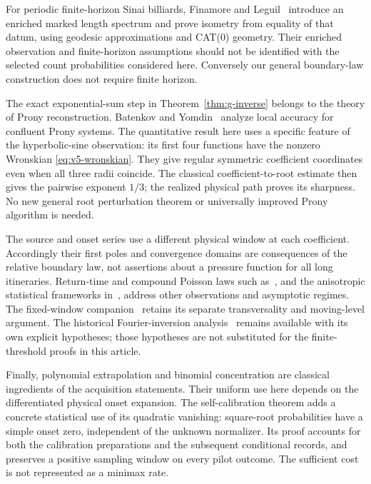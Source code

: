 For periodic finite-horizon Sinai billiards, Finamore and
Leguil~\cite{FinamoreLeguil} introduce an enriched marked length spectrum
and prove isometry from equality of that datum, using geodesic
approximations and CAT(0) geometry. Their enriched observation and
finite-horizon assumptions should not be identified with the selected
count probabilities considered here. Conversely our general boundary-law
construction does not require finite horizon.

The exact exponential-sum step in Theorem~\ref{thm:g-inverse} belongs
to the theory of Prony reconstruction. Batenkov and Yomdin~\cite{BYProny}
analyze local accuracy for confluent Prony systems. The quantitative
result here uses a specific feature of the hyperbolic-sine observation:
its first four functions have the nonzero Wronskian
\eqref{eq:v5-wronskian}. They give regular symmetric coefficient
coordinates even when all three radii coincide. The classical
coefficient-to-root estimate then gives the pairwise exponent $1/3$;
the realized physical path proves its sharpness. No new general root
perturbation theorem or universally improved Prony algorithm is needed.

The source and onset series use a different physical window at each
coefficient. Accordingly their first poles and convergence domains are
consequences of the relative boundary law, not assertions about a
pressure function for all long itineraries. Return-time and compound
Poisson laws such as~\cite{Marklof,CNZ}, and the anisotropic statistical
frameworks in~\cite{DMN,DemersZhang}, address other observations and
asymptotic regimes. The fixed-window companion~\cite{TC} retains its
separate transversality and moving-level argument. The historical
Fourier-inversion analysis~\cite{A2R33} remains available with its own
explicit hypotheses; those hypotheses are not substituted for the
finite-threshold proofs in this article.

Finally, polynomial extrapolation and binomial concentration are
classical ingredients of the acquisition statements. Their uniform use
here depends on the differentiated physical onset expansion. The
self-calibration theorem adds a concrete statistical use of its
quadratic vanishing: square-root probabilities have a simple onset
zero, independent of the unknown normalizer. Its proof accounts for
both the calibration preparations and the subsequent conditional
records, and preserves a positive sampling window on every pilot outcome.
The sufficient cost is not represented as a minimax rate.

